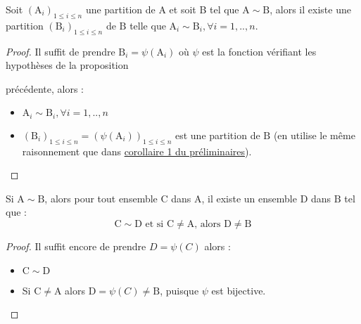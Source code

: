 \begin{Co}
  Soit $\left(\mathrm{A}_i\right)_{1\le i \le n}$ une partition de $\mathrm{A}$ et soit B tel que $\mathrm{A} \sim \mathrm{B}$, alors il existe une partition $\left(\mathrm{B}_i\right)_{1\le i \le n}$ de $\mathrm{B}$ telle que $\mathrm{A}_i \sim \mathrm{B}_i, \forall i=1,..,n$.
\end{Co}
\begin{proof}
  \hfill

Il suffit de prendre $\mathrm{B}_i = \psi(\mathrm{A}_i)$ où $\psi$ est la fonction vérifiant les hypothèses de la proposition\par précédente, alors :
\begin{itemize}
  \item $\mathrm{A}_i \sim \mathrm{B}_i, \forall i=1,..,n$
  \item $(\mathrm{B}_i)_{1\le i \le n} = (\psi(\mathrm{A}_i))_{1\le i \le n}$ est une partition de $\mathrm{B}$ (en utilise le même raisonnement que dans \hyperref[lemme 2]{corollaire 1 du préliminaires}).
\end{itemize}
\end{proof}
\begin{Co}
 Si $\mathrm{A} \sim \mathrm{B}$, alors pour tout ensemble $\mathrm{C}$ dans $\mathrm{A}$, il existe un ensemble $\mathrm{D}$ dans $\mathrm{B}$ tel que :
 $$\mathrm{C} \sim \mathrm{D} \text{ et si }  \mathrm{C} \neq \mathrm{A} \text{, alors } \mathrm{D} \neq \mathrm{B}$$
\end{Co}
\begin{proof}
Il suffit encore de prendre $D = \psi(C)$ alors :
\begin{itemize}
  \item $\mathrm{C} \sim \mathrm{D}$
  \item Si $\mathrm{C} \neq \mathrm{A}$ alors $\mathrm{D}=\psi(C) \neq \mathrm{B}$, puisque $\psi$ est bijective.
\end{itemize}
\end{proof}

